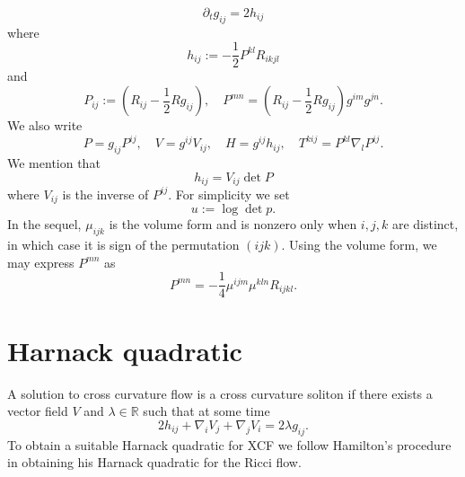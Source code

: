 \documentclass{amsart}
\theoremstyle{definition}
\theoremstyle{remark}
\numberwithin{equation}{section}
\begin{document}
\begin{equation}
\partial_tg_{ij}=2h_{ij}
\end{equation}
where
\begin{equation}
h_{ij}:=-\frac{1}{2}P^{kl}R_{ikjl}
\end{equation}
and
\begin{equation}
P_{ij}:=(R_{ij}-\frac{1}{2}Rg_{ij}),\quad
P^{mn}=(R_{ij}-\frac{1}{2}Rg_{ij})g^{im}g^{jn}.
\end{equation}
We also write
\begin{equation}
P=g_{ij}P^{ij},\quad V=g^{ij}V_{ij},\quad H=g^{ij}h_{ij},\quad  T^{kij}=P^{kl}\nabla_l P^{ij}.
\end{equation}
We mention that
\begin{equation}
h_{ij}=V_{ij}\det P
\end{equation}
where $V_{ij}$ is the inverse of $P^{ij}.$
For simplicity we set
\[u:=\log\det p.\]
In the sequel, $\mu_{ijk}$ is the volume form and is nonzero only when $i,j,k$ are distinct, in which case it is sign of the permutation $(ijk)$. Using the volume form, we may express $P^{mn}$ as
\begin{equation}
P^{mn}=-\frac{1}{4}\mu^{ijm}\mu^{kln}R_{ijkl}.
\end{equation}
\section{Harnack quadratic}
A solution to cross curvature flow is a cross curvature soliton if there exists a vector field $V$ and $\lambda\in \mathbb{R}$ such that at some time
\begin{equation}
2h_{ij}+\nabla_iV_j+\nabla_jV_i=2\lambda g_{ij}.
\end{equation}
To obtain a suitable Harnack quadratic for XCF we follow Hamilton's procedure in obtaining his Harnack quadratic for the Ricci flow.
\end{document}
